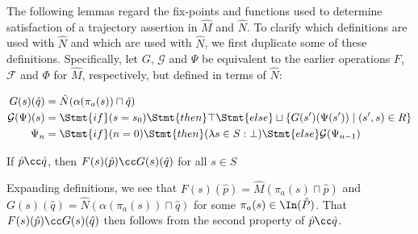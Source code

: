 

The following lemmas regard the fix-points and functions used to determine satisfaction of a trajectory assertion in $\hat M$ and $\hat N$. To clarify which definitions are used with $\hat N$ and which are used with $\hat N$, we first duplicate some of these definitions. Specifically, let $G$, $\mathcal{G}$ and $\Psi$ be equivalent to the earlier operations $F$, $\mathcal{F}$ and $\Phi$ for $\hat M$, respectively, but defined in terms of $\hat N$:


\begin{align*}
G(s)(\hat q) &= \hat N(\alpha(\pi_{a}(s)) \sqcap \hat q) \\
\mathcal{G}(\Psi)(s) &= \Stmt{if } (s = s_{0}) \Stmt{ then } \top \Stmt{ else } \sqcup \{ G(s')(\Psi(s')) \mid (s',s) \in R \} \\
\Psi_{n} &= \Stmt{if } (n = 0) \Stmt{ then } (\lambda s \in S : \bot) \Stmt{ else } \mathcal{G}(\Psi_{n-1}) \\
\end{align*}



\begin{lemma} \label{lem:F-refine-G}
If $\hat p \cc \hat q$, then $F(s)(\hat p) \cc G(s)(\hat q)$ for all $s \in S$
\end{lemma}

Expanding definitions, we see that $F(s)(\hat p) = \hat M(\pi_{a}(s) \sqcap \hat p)$ and $G(s)(\hat q) = \hat N(\alpha(\pi_{a}(s)) \sqcap \hat q)$ for some $\pi_{a}(s) \in \In(\hat P)$. That $F(s)(\hat p) \cc G(s)(\hat q)$ then follows from the second property of $\hat p \cc \hat q$.

